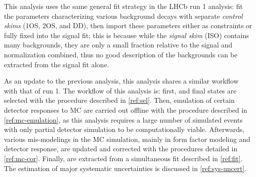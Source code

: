 
This analysis uses the same general fit strategy in the LHCb \RDX run 1
analysis:
fit the parameters characterizing various background decays with separate
\emph{control skims} (1OS, 2OS, and DD),
then import these parameters either as constraints or fully fixed into the
signal fit;
this is because while the \emph{signal skim} (ISO) contains many
backgrounds,
they are only a small fraction relative to the signal and normalization
combined,
thus no good description of the backgrounds can be extracted from the signal fit
alone.


As an update to the previous analysis, this analysis shares a similar
workflow with that of run 1.
The workflow of this analysis is:
first, \Dstarp\mun and \Dz\mun final states are selected with the procedure
described in \cref{ref:sel}.
Then, emulation of certain detector responses to MC are carried out offline
with the procedure described in
\cref{ref:mc-emulation},
as this analysis requires a large number of simulated events with only partial
detector simulation to be computationally viable.
Afterwards, various mis-modelings in the MC simulation,
mainly in form factor modeling and detector response, are updated and
corrected with the procedures detailed in \cref{ref:mc-cor}.
Finally, \RDX are extracted from a simultaneous fit described in \cref{ref:fit}.
The estimation of major systematic uncertainties is discussed in
\cref{ref:sys-uncert}.


